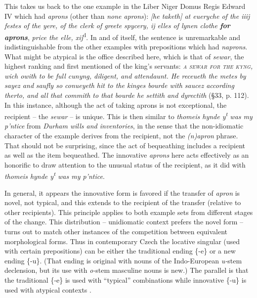 \documentclass[output=paper,
modfonts
]{LSP/langsci}
\begin{document}
This takes us back to the one example in the Liber Niger Domus Regis
Edward IV which had \emph{aprons} (other than \emph{none aprons}):
\emph{{[}he taketh{]} at eueryche of the iiij festes of the yere, of the
clerk of greete spycery, ij elles of lynen clothe \textbf{for aprons}},
\emph{price the elle, xij}\textsuperscript{d}. In and of itself, the
sentence is unremarkable and indistinguishable from the other examples
with prepositions which had \emph{naprons}. What might be atypical is
the office described here, which is that of \emph{sewar}, the highest
ranking and first mentioned of the king's servants: \emph{\textsc{a
sewar for the kyng}, wich owith to be full cunyng, diligent, and
attendaunt. He receueth the metes by sayez and} \emph{saufly so
conueyeth hit to the kinges bourde with saucez according therto, and all
that commith to that bourde he settith and dyrectith} (§33, p. 112). In
this instance, although the act of taking aprons is not exceptional, the
recipient -- the \emph{sewar} -- is unique. This is then similar to
\emph{thomeis hynde y\textsuperscript{t} was my p'ntice} from \emph{Durham
wills and inventories}, in the sense that the non-idiomatic character of the example
derives from the recipient, not the \emph{(n)apron} phrase. That should
not be surprising, since the act of bequeathing includes a recipient as
well as the item bequeathed. The innovative \emph{aprons} here acts
effectively as an honorific to draw attention to the unusual status of
the recipient, as it did with \emph{thomeis hynde y\textsuperscript{t}
was my p'ntice}.

In general, it appears the innovative form is favored if the transfer of
\emph{apron} is novel, not typical, and this extends to the recipient of
the transfer (relative to other recipients). This principle applies to
both example sets from different stages of the change. This
distribution -- unidiomatic context prefers the novel form -- turns out to
match other instances of the competition between equivalent
morphological forms. Thus in contemporary Czech the locative singular
(used with certain prepositions) can be either the traditional ending
\{-e\} or a new ending \{-u\}. (That ending is original with nouns of
the Indo-European \emph{u-}stem declension, but its use with
\emph{o-}stem masculine nouns is new.) The parallel is that the
traditional \mbox{\{-e\}} is used with ``typical'' combinations while
innovative \{-u\} is used with atypical contexts \citep{BERM}.
\end{document}
